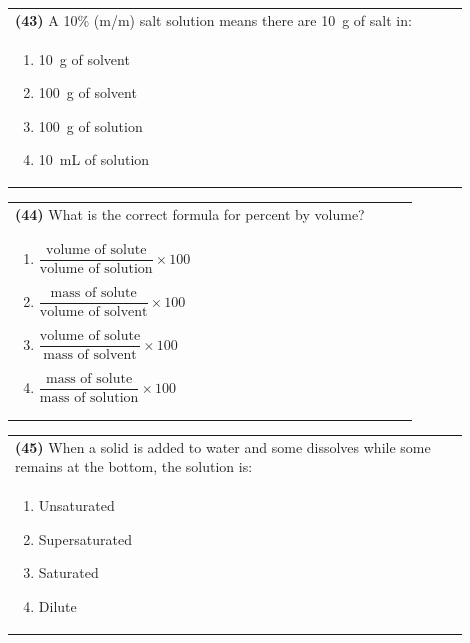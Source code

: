 \documentclass{article}
\begin{document}
\noindent\begin{tabular}{|p{0.9\linewidth}|}
\hline
\textbf{(43)} A 10\% (m/m) salt solution means there are 10~g of salt in:\\[0.2cm]
\begin{minipage}[t]{0.85\linewidth}
\begin{enumerate}[label=\alph*.]
\item 10~g of solvent
\item 100~g of solvent
\item 100~g of solution
\item 10~mL of solution
\end{enumerate}
\end{minipage}\\[0.2cm]
\hline
\end{tabular}

\noindent\begin{tabular}{|p{0.9\linewidth}|}
\hline
\textbf{(44)} What is the correct formula for percent by volume?\\[0.2cm]
\begin{minipage}[t]{0.85\linewidth}
\begin{enumerate}[label=\alph*.]
\item $\dfrac{\text{volume of solute}}{\text{volume of solution}} \times 100$
\item $\dfrac{\text{mass of solute}}{\text{volume of solvent}} \times 100$
\item $\dfrac{\text{volume of solute}}{\text{mass of solvent}} \times 100$
\item $\dfrac{\text{mass of solute}}{\text{mass of solution}} \times 100$
\end{enumerate}
\end{minipage}\\[0.2cm]
\hline
\end{tabular}
\newpage

\noindent\begin{tabular}{|p{0.9\linewidth}|}
\hline
\textbf{(45)} When a solid is added to water and some dissolves while some remains at the bottom, the solution is:\\[0.2cm]
\begin{minipage}[t]{0.85\linewidth}
\begin{enumerate}[label=\alph*.]
\item Unsaturated
\item Supersaturated
\item Saturated
\item Dilute
\end{enumerate}
\end{minipage}\\[0.2cm]
\hline
\end{tabular}
\end{document}
